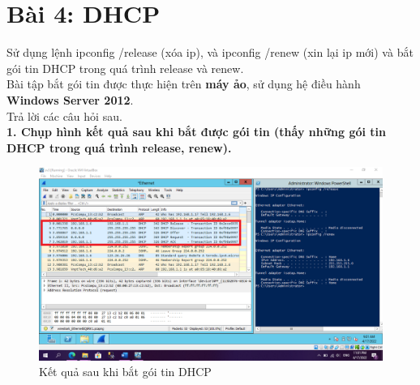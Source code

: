 \section{Bài 4: DHCP}
Sử dụng lệnh ipconfig /release (xóa ip), và ipconfig /renew (xin lại ip mới) và bắt gói tin DHCP trong quá trình release và renew.\\
Bài tập bắt gói tin được thực hiện trên \textbf{máy ảo}, sử dụng hệ điều hành \textbf{Windows Server 2012}.\\
Trả lời các câu hỏi sau.\\

\textbf{1.	Chụp hình kết quả sau khi bắt được gói tin (thấy những gói tin DHCP trong quá trình release, renew).}
\begin{figure}[H]
\begin{center}
\includegraphics[scale=.4]{../figures/p4/p4_1}
\end{center}
\caption{Kết quả sau khi bắt gói tin DHCP}
\end{figure}

